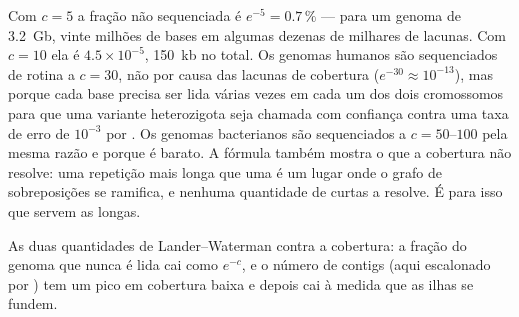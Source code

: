 \begin{example}\label{ex:b3:genomics:coverage}
Com $c = 5$ a fração não sequenciada é $e^{-5} = 0.7\,\%$ --- para um
genoma de \qty{3.2}{Gb}, vinte milhões de bases em algumas dezenas de
milhares de lacunas. Com $c = 10$ ela é $4.5\times 10^{-5}$,
\qty{150}{kb} no total. Os genomas humanos são sequenciados de rotina
a $c = 30$, não por causa das lacunas de cobertura
($e^{-30} \approx 10^{-13}$), mas porque cada base precisa ser lida
várias vezes em cada um dos dois cromossomos para que uma variante
heterozigota seja chamada com confiança contra uma taxa de erro de
$10^{-3}$ por . Os genomas bacterianos são sequenciados a
$c = 50$--$100$ pela mesma razão e porque é barato. A fórmula também
mostra o que a cobertura não resolve: uma repetição mais longa que uma
 é um lugar onde o grafo de sobreposições se ramifica, e
nenhuma quantidade de  curtas a resolve. É para isso que
servem as  longas.
\end{example}

\begin{omfigure}

{\small As duas quantidades de Lander--Waterman contra a cobertura: a
fração do genoma que nunca é lida cai como $e^{-c}$, e o número de
contigs (aqui escalonado por ) tem um pico em cobertura baixa e
depois cai à medida que as ilhas se fundem.}
\end{omfigure}


